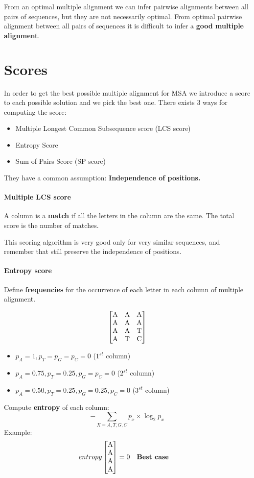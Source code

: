 From an optimal multiple alignment we can infer pairwise alignments between all pairs of sequences, but they are not necessarily optimal. From optimal pairwise alignment between all pairs of sequences it is difficult to infer a \textbf{good multiple alignment}.
\section{Scores}
In order to get the best possible multiple alignment for MSA we introduce a score to each possible solution and we pick the best one. There exists 3 ways for computing the score:
\begin{itemize}
	\item Multiple Longest Common Subsequence score (LCS score)
	\item Entropy Score
	\item Sum of Pairs Score (SP score)
\end{itemize}
They have a common assumption: \textbf{Independence of positions.}


\paragraph{Multiple LCS score}
A column is a \textbf{match} if all the letters in the column are the same. The total score is the number of matches.

This scoring algorithm is very good only for very similar sequences, and remember that still preserve the independence of positions.
\paragraph{Entropy score}
Define \textbf{frequencies} for the occurrence of each letter in each column of multiple alignment.

\begin{align}
\begin{bmatrix}
$A$&$A$&$A$ \\
$A$&$A$&$A$ \\
$A$&$A$&$T$ \\
$A$&$T$&$C$
\end{bmatrix}
\end{align}

\begin{itemize}
	\item $p_A = 1, p_T = p_G = p_C = 0$ ($1^{st}$ column)
	\item $p_A = 0.75, p_T = 0.25, p_G = p_C = 0$ ($2^{st}$ column)
	\item $p_A = 0.50, p_T = 0.25, p_G = 0.25, p_C = 0$ ($3^{st}$ column)
\end{itemize}
Compute \textbf{entropy} of each column:
$$- \sum_{X = A,T,G,C} p_x \times \log_2p_x$$
Example:
\begin{align}
entropy & \begin{bmatrix}
$A$ \\
$A$ \\
$A$ \\
$A$
\end{bmatrix} = 0 && \text{\textbf{Best case}}
\end{align}


